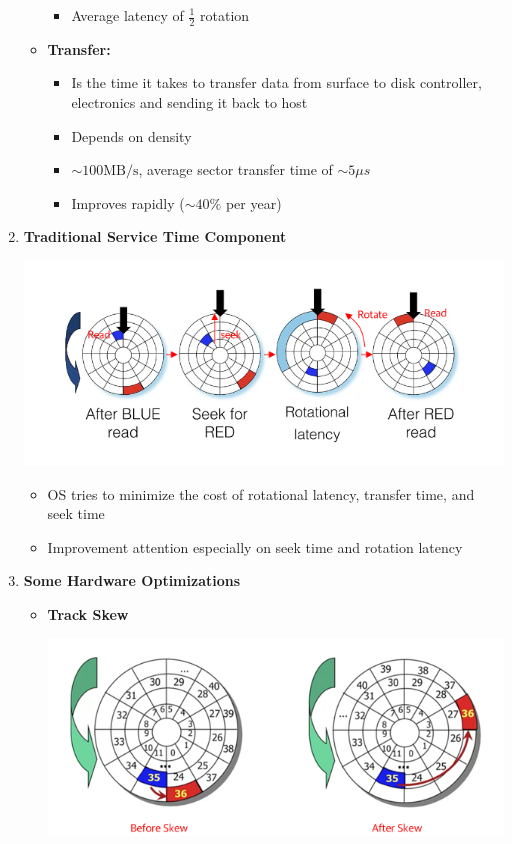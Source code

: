 \documentclass[12pt]{article}
\begin{document}
\begin{enumerate}[1.]
\begin{itemize}
\begin{itemize}
            \item Average latency of $\frac{1}{2}$ rotation
        \end{itemize}
        \item \textbf{Transfer:}
        \begin{itemize}
            \item Is the time it takes to transfer data from surface to disk controller, electronics
            and sending it back to host
            \item Depends on density
            \item $\sim 100 \text{MB/s}$, average sector transfer time of $\sim 5 \mu s$
            \item Improves rapidly ($\sim 40\%$ per year)
        \end{itemize}
    \end{itemize}
    \item \textbf{Traditional Service Time Component}

    \begin{center}
    \includegraphics[width=0.8\linewidth]{images/notes_2.png}
    \end{center}

    \begin{itemize}
        \item OS tries to minimize the cost of rotational latency, transfer time, and seek time
        \item Improvement attention especially on seek time and rotation latency
    \end{itemize}

    \item \textbf{Some Hardware Optimizations}
    \begin{itemize}
        \item \textbf{Track Skew}

        \begin{center}
        \includegraphics[width=0.8\linewidth]{images/notes_3.png}
        \end{center}


\end{itemize}
\end{enumerate}
\end{document}
